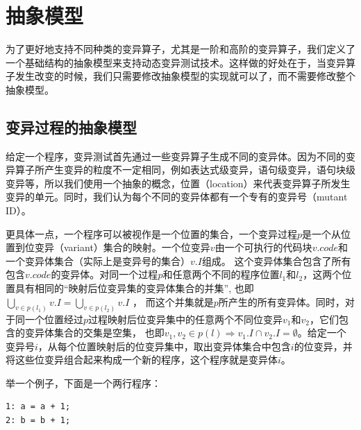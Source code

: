 \documentclass[nofonts]{ctexrep}
\begin{document}
\section{抽象模型}
\newcommand{\mids}{\ensuremath{I}\xspace}
\newcommand{\execute}{\ensuremath{\mathrm{execute}}\xspace}
\newcommand{\try}{\ensuremath{\mathtt{try}}\xspace}
\newcommand{\apply}{\ensuremath{\mathtt{apply}}\xspace}
\newcommand{\filterv}{\ensuremath{\mathrm{filter\_variants}}\xspace}
\newcommand{\filterm}{\ensuremath{\mathrm{filter\_mutants}}\xspace}
\newcommand{\filterom}{\ensuremath{\mathrm{filter\_out\_mutants}}\xspace}
\newcommand{\VectorSet}{{\tt VectorSet}\xspace}
\newcommand{\ListSet}{{\tt ListSet}\xspace}
\newcommand{\DefaultSet}{{\tt DefaultSet}\xspace}
为了更好地支持不同种类的变异算子，尤其是一阶和高阶的变异算子，我们定义了一个基础结构的抽象模型来支持动态变异测试技术。这样做的好处在于，当变异算子发生改变的时候，我们只需要修改抽象模型的实现就可以了，而不需要修改整个抽象模型。

\subsection{变异过程的抽象模型}

给定一个程序，变异测试首先通过一些变异算子生成不同的变异体。因为不同的变异算子所产生变异的粒度不一定相同，例如表达式级变异，语句级变异，语句块级变异等，所以我们使用一个抽象的概念，位置（location）来代表变异算子所发生变异的单元。同时，我们认为每个不同的变异体都有一个专有的变异号（mutant ID）。

更具体一点，一个程序可以被视作是一个位置的集合，一个变异过程$p$是一个从位置到位变异（variant）集合的映射。一个位变异$v$由一个可执行的代码块$v.code$和一个变异体集合（实际上是变异号的集合）$v.\mids$组成。
这个变异体集合包含了所有包含$v.code$的变异体。对同一个过程$p$和任意两个不同的程序位置$l_1$和$l_2$，这两个位置具有相同的``映射后位变异集的变异体集合的并集'',
也即$\bigcup_{v \in p(l_1)} v.\mids=\bigcup_{v \in p(l_2)} v.\mids$ ，
而这个并集就是$p$所产生的所有变异体。同时，对于同一个位置经过$p$过程映射后位变异集中的任意两个不同位变异$v_1$和$v_2$，它们包含的变异体集合的交集是空集，
也即$v_1, v_2 \in p(l)
\Rightarrow v_1.\mids \cap v_2.\mids = \emptyset$。给定一个变异号$i$，从每个位置映射后的位变异集中，取出变异体集合中包含$i$的位变异，并将这些位变异组合起来构成一个新的程序，这个程序就是变异体$i$。

举一个例子，下面是一个两行程序：
\begin{verbatim}
1: a = a + 1;
2: b = b + 1;
\end{verbatim}
\end{document}
